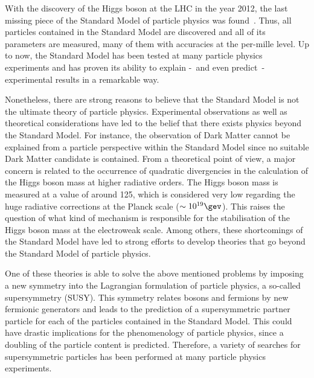 \noindent With the discovery of the Higgs boson at the LHC in the year 2012, the last missing piece of the Standard Model of particle physics was found~\cite{bib:Theory:CMS:HiggsObservation,bib:Theory:Atlas:HiggsObservation}.
Thus, all particles contained in the Standard Model are discovered and all of its parameters are measured, many of them with accuracies at the per-mille level.
Up to now,  the Standard Model has been tested at many particle physics experiments and has proven its ability to explain -~and even predict~- experimental results in a remarkable way.


Nonetheless, there are strong reasons to believe that the Standard Model is not the ultimate theory of particle physics.
Experimental observations as well as theoretical considerations have led to the belief that there exists physics beyond the Standard Model.
For instance, the observation of Dark Matter cannot be explained from a particle perspective within the Standard Model since no suitable Dark Matter candidate is contained.
From a theoretical point of view, a major concern is related to the occurrence of quadratic divergencies in the calculation of the Higgs boson mass at higher radiative orders.
The Higgs boson mass is measured at a value of around 125\gev, which is considered very low regarding the huge radiative corrections at the Planck scale ($\sim 10^{19}\gev$). 
This raises the question of what kind of mechanism is responsible for the stabilisation of the Higgs boson mass at the electroweak scale. 
Among others, these shortcomings of the Standard Model have led to strong efforts to develop theories that go beyond the Standard Model of particle physics. 

One of these theories is able to solve the above mentioned problems by imposing a new symmetry into the Lagrangian formulation of particle physics, a so-called supersymmetry (SUSY).
This symmetry relates bosons and fermions by new fermionic generators and leads to the prediction of a supersymmetric partner particle for each of the particles contained in the Standard Model.
This could have drastic implications for the phenomenology of particle physics, since a doubling of the particle content is predicted.
Therefore, a variety of searches for supersymmetric particles has been performed at many particle physics experiments.\\

